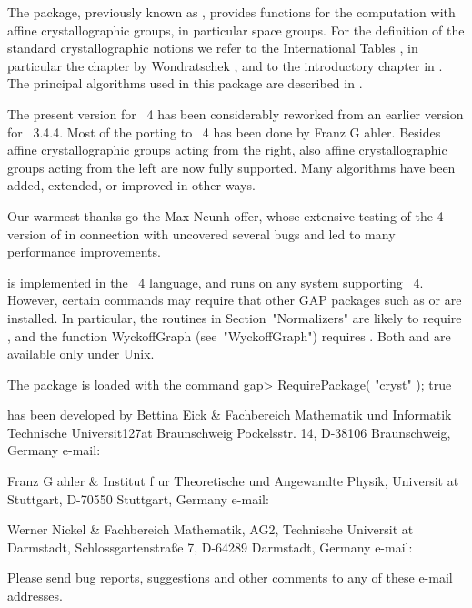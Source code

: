 

The {\Cryst} package, previously known as , provides 
functions for the computation with affine crystallographic groups, 
in particular space groups. For the definition of the standard 
crystallographic notions we refer to the International Tables 
\cite{Hah95}, in particular the chapter by Wondratschek \cite{Won95},
and to the introductory chapter in \cite{BBNWZ78}. The principal 
algorithms used in this package are described in \cite{EGN97}.

The present version for {\GAP}~4 has been considerably reworked from
an earlier version for {\GAP}~3.4.4. Most of the porting to {\GAP}~4
has been done by Franz G{ a}hler. Besides affine crystallographic
groups acting from the right, also affine crystallographic groups acting 
from the left are now fully supported. Many algorithms have been added, 
extended, or improved in other ways.

Our warmest thanks go the Max Neunh{ o}ffer, whose extensive
testing of the {\GAP} 4 version of {\Cryst} in connection with {\XGAP} 
uncovered several bugs and led to many performance improvements.

{\Cryst} is implemented in the {\GAP}~4 language, and runs on any 
system supporting {\GAP}~4. However, certain commands may require 
that other GAP packages such as {\CARAT} or {\XGAP} are installed.
In particular, the routines in Section~"Normalizers" are likely
to require {\CARAT}, and the function WyckoffGraph (see~"WyckoffGraph")
requires {\XGAP}. Both {\CARAT} and {\XGAP} are available only under Unix.

The {\Cryst} package is loaded with the command
\beginexample 
gap> RequirePackage( "cryst" ); 
true
\endexample

{\Cryst} has been developed by
\beginitems
Bettina Eick &
Fachbereich Mathematik und Informatik\hfil\break
Technische Universit\accent127at Braunschweig\hfil\break
Pockelsstr. 14, D-38106 Braunschweig, Germany\hfil\break
e-mail: 

Franz G{ a}hler &
Institut f{ u}r Theoretische und Angewandte Physik,\hfil\break
Universit{ a}t Stuttgart,
D-70550 Stuttgart, Germany \hfill\break
e-mail: 

Werner Nickel &
Fachbereich Mathematik, AG2,
Technische Universit{ a}t Darmstadt, \hfill\break
Schlossgartenstra{\ss}e 7, D-64289 Darmstadt, Germany \hfil\break
e-mail: 
\enditems

Please send bug reports, suggestions and other comments to any of these
e-mail addresses.







